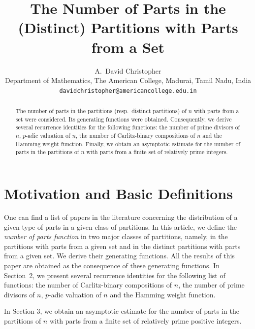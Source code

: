 \documentclass[11pt]{article}
\title{The Number of Parts in the (Distinct) Partitions with Parts from a Set}
\author{A.~David Christopher \\ 
Department of Mathematics, The American College, Madurai, Tamil Nadu, India \\
\texttt{davidchristopher@americancollege.edu.in}
}
\date{} %
\begin{document}
\maketitle

\begin{abstract}
The number of parts in the partitions (resp.\ distinct partitions) of $n$ with parts from a set were considered. Its generating functions were obtained. Consequently, we derive several recurrence identities for the following functions: the number of prime divisors of $n$, $p$-adic valuation of $n$, the number of Carlitz-binary compositions of $n$ and the Hamming weight function. Finally, we obtain an asymptotic estimate for the number of parts in the partitions of $n$ with parts from a finite set of relatively prime integers.
\end{abstract}

\section{Motivation and Basic Definitions}

One can find a list of papers \cite{charlotte,erdos,hsien,lee,loxton,william} in the literature concerning the distribution of a given type of parts in a given class of partitions. 
In this article, we define the \emph{number of parts function} in two major classes of partitions, namely, in the partitions with parts from a given set and in the distinct partitions with parts from a given set. We derive their generating functions. All the results of this paper are obtained as the consequence of these generating functions. 
In Section~2, we present several recurrence identities for the following list of functions: the number of Carlitz-binary compositions of $n$, the number of prime divisors of $n$, $p$-adic valuation of $n$ and the Hamming weight function. 

In Section 3, we obtain an asymptotic estimate for the number of parts in the partitions of $n$ with parts from a finite set of relatively prime positive integers. 
\end{document}
